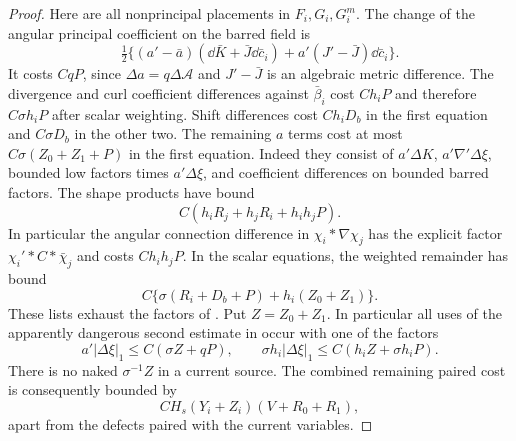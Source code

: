 \begin{proof}
Here are all nonprincipal placements in $F_i,G_i,G_i^m$.
The change of the angular principal coefficient on the barred field
is
\begin{equation}\label{dn:principal-coefficient-error}
 \tfrac12\{(a'-\bar a)(\dd\bar K+\bar J\dd\bar c_i)
                      +a'(J'-\bar J)\dd\bar c_i\}.
\end{equation}
It costs $CqP$, since $\Delta a=q\Delta\mathcal A$ and $J'-\bar J$
is an algebraic metric difference.  The divergence and curl
coefficient differences against $\bar\beta_i$ cost $Ch_iP$ and
therefore $C\sigma h_iP$ after scalar weighting.  Shift differences
cost $Ch_iD_b$ in the first equation and $C\sigma D_b$ in the other
two.  The remaining $a$ terms cost at most
$C\sigma(Z_0+Z_1+P)$ in the first equation.  Indeed they consist of
$a'\Delta K$, $a'\nabla'\Delta\xi$, bounded low factors times
$a'\Delta\xi$, and coefficient differences on bounded barred
factors.  The shape products have bound
\begin{equation}\label{dn:shape-product-error}
 C(h_iR_j+h_jR_i+h_ih_jP).
\end{equation}
In particular the angular connection difference in
$\chi_i*\nabla\chi_j$ has the explicit factor
$\chi_i'*C*\bar\chi_j$ and costs $Ch_ih_jP$.
In the scalar equations, the weighted remainder has bound
\[
 C\{\sigma(R_i+D_b+P)+h_i(Z_0+Z_1)\}.
\]
These lists exhaust the factors of . Put $Z=Z_0+Z_1$.
In particular all
uses of the apparently dangerous second estimate in
 occur with one of the factors
\begin{equation}\label{dn:compensation}
 a'|\Delta\xi|_1\le C(\sigma Z+qP),\qquad
 \sigma h_i|\Delta\xi|_1\le C(h_iZ+\sigma h_iP).
\end{equation}
There is no naked $\sigma^{-1}Z$ in a current source.
The combined remaining paired cost is consequently bounded by
\begin{equation}\label{dn:low-pair-cost}
 C H_s(Y_i+Z_i)(V+R_0+R_1),
\end{equation}
apart from the defects paired with the current variables.


\end{proof}

